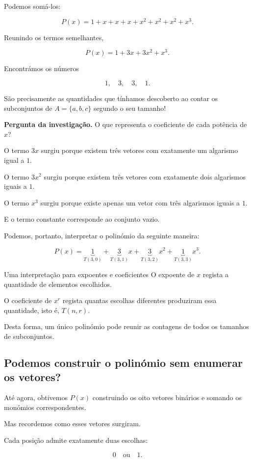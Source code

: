 \documentclass[11pt,a4paper,oneside]{book}
\newcommand{\Pergunta}[1]{\begin{perguntabox}\textbf{Pergunta da investigação.} #1\end{perguntabox}}
\begin{document}
Podemos somá-los:

\[
P(x)=1+x+x+x+x^2+x^2+x^2+x^3.
\]

Reunindo os termos semelhantes,

\[
\boxed{P(x)=1+3x+3x^2+x^3}.
\]

Encontrámos os números

\[
1,\quad3,\quad3,\quad1.
\]

São precisamente as quantidades que tínhamos
descoberto ao contar os subconjuntos de
$A=\{a,b,c\}$ segundo o seu tamanho!

\Pergunta{O que representa o coeficiente de cada
potência de $x$?}

O termo $3x$ surgiu porque existem três vetores
com exatamente um algarismo igual a $1$.

O termo $3x^2$ surgiu porque existem três vetores
com exatamente dois algarismos iguais a $1$.

O termo $x^3$ surgiu porque existe apenas um vetor
com três algarismos iguais a $1$.

E o termo constante corresponde ao conjunto vazio.

Podemos, portanto, interpretar o polinómio
da seguinte maneira:

\[
P(x)=
\underbrace{1}_{T(3,0)}
+
\underbrace{3}_{T(3,1)}x
+
\underbrace{3}_{T(3,2)}x^2
+
\underbrace{1}_{T(3,3)}x^3.
\]

\begin{descobertabox}{Uma interpretação para expoentes e coeficientes}
O expoente de $x$ regista a quantidade de
elementos escolhidos.

O coeficiente de $x^r$ regista quantas
escolhas diferentes produziram essa quantidade,
isto é, $T(n,r)$.

Desta forma, um único polinómio pode reunir
as contagens de todos os tamanhos de subconjuntos.
\end{descobertabox}

\subsection*{Podemos construir o polinómio sem enumerar os vetores?}

Até agora, obtivemos $P(x)$ construindo os oito
vetores binários e somando os monómios
correspondentes.

Mas recordemos como esses vetores surgiram.

Cada posição admite exatamente duas escolhas:

\[
0\quad\text{ou}\quad1.
\]
\end{document}
